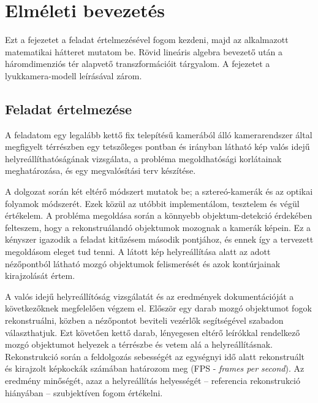 \chapter{Elméleti bevezetés}\label{ch:elmelet}

Ezt a fejezetet a feladat értelmezésével fogom kezdeni, majd az alkalmazott matematikai hátteret mutatom be. Rövid lineáris algebra bevezető után a háromdimenziós tér alapvető transzformációit tárgyalom. A fejezetet a lyukkamera-modell leírásával zárom.

\section{Feladat értelmezése}

A feladatom egy legalább kettő fix telepítésű kamerából álló kamerarendszer által megfigyelt térrészben egy tetszőleges pontban és irányban látható kép valós idejű helyreállíthatóságának vizsgálata, a probléma megoldhatósági korlátainak meghatározása, és egy megvalósítási terv készítése.

A dolgozat során két eltérő módszert mutatok be; a sztereó-kamerák és az optikai folyamok módszerét. Ezek közül az utóbbit implementálom, tesztelem és végül értékelem. A probléma megoldása során a könnyebb objektum-detekció érdekében felteszem, hogy a rekonstruálandó objektumok mozognak a kamerák képein. Ez a kényszer igazodik a feladat kitűzésem második pontjához, és ennek így a tervezett megoldásom eleget tud tenni. A látott kép helyreállítása alatt az adott nézőpontból látható mozgó objektumok felismerését és azok kontúrjainak kirajzolását értem.

A valós idejű helyreállítóság vizsgálatát és az eredmények dokumentációját a következőknek megfelelően végzem el. Először egy darab mozgó objektumot fogok rekonstruálni, közben a nézőpontot beviteli vezérlők segítségével szabadon választhatjuk. Ezt követően kettő darab, lényegesen eltérő leírókkal rendelkező mozgó objektumot helyezek a térrészbe és vetem alá a helyreállításnak. Rekonstrukció során a feldolgozás sebességét az egységnyi idő alatt rekonstruált és kirajzolt képkockák számában határozom meg (FPS - \textit{frames per second}). Az eredmény minőségét, azaz a helyreállítás helyességét -- referencia rekonstrukció hiányában -- szubjektíven fogom értékelni.

